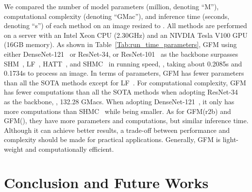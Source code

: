 \documentclass[twocolumn]{svjour3}
\begin{document}
We compared the number of model parameters (million, denoting ``M''), computational complexity (denoting ``GMac''), and inference time (seconds, denoting ``s'') of each method on an image resized to . All methods are performed on a server with an Intel Xeon CPU (2.30GHz) and an NIVDIA Tesla V100 GPU (16GB memory). As shown in Table~\ref{Tab:run_time_parameters}, GFM using either DenseNet-121~\citep{huang2017densely} or ResNet-34, or ResNet-101~\citep{he2016deep} as the backbone surpasses SHM~\citep{chen2018semantic}, LF~\citep{zhang2019late}, HATT~\citep{Qiao_2020_CVPR}, and SHMC~\citep{liu2020boosting} in running speed, , taking about 0.2085s and 0.1734s to process an image. In terms of parameters, GFM has fewer parameters than all the SOTA methods except for LF~\citep{zhang2019late}. For computational complexity, GFM has fewer computations than all the SOTA methods when adopting ResNet-34~\citep{he2016deep} as the backbone, , 132.28 GMacs. When adopting DenseNet-121~\citep{huang2017densely}, it only has more computations than SHMC~\citep{liu2020boosting} while being smaller. As for GFM(r2b) and GFM(), they have more parameters and computations, but similar inference time. Although it can achieve better results, a trade-off between performance and complexity should be made for practical applications. Generally, GFM is light-weight and computationally efficient.


\section{Conclusion and Future Works}
\end{document}
